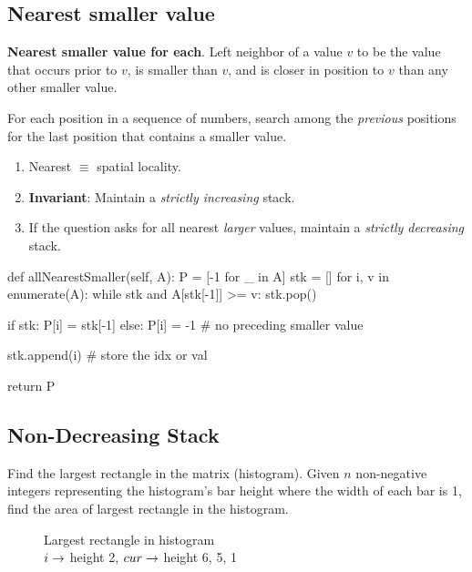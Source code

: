 \subsection{Nearest smaller value}\label{allNearestSmaller}
\textbf{Nearest smaller value for each}. Left neighbor of a value $v$ to be the value that occurs prior to $v$, is smaller than $v$, and is closer in position to $v$ than any other smaller value.

For each position in a sequence of numbers, search among the \textit{previous} positions for the last position that contains a smaller value. 

\begin{enumerate}
\item Nearest $\equiv$ spatial locality.
\item \textbf{Invariant}: Maintain a \textit{strictly increasing} stack.  
\item If the question asks for all nearest \textit{larger} values, maintain a \textit{strictly decreasing} stack.  
\end{enumerate}

\begin{python}
def allNearestSmaller(self, A):
    P = [-1 for _ in A]
    stk = []
    for i, v in enumerate(A):
        while stk and A[stk[-1]] >= v:
            stk.pop()

        if stk:
            P[i] = stk[-1]
        else:
            P[i] = -1  # no preceding smaller value
            
        stk.append(i)  # store the idx or val

    return P
\end{python}


\subsection{Non-Decreasing Stack}
 Find the largest rectangle in the matrix (histogram). Given $n$ non-negative integers representing the histogram's bar height where the width of each bar is 1, find the area of largest rectangle in the histogram. 

\begin{figure}[]
\centering
{}
\caption{Largest rectangle in histogram\\ $i \rightarrow$ height 2, $cur \rightarrow$ height 6, 5, 1}
\label{fig:histogram_area}
\end{figure}

